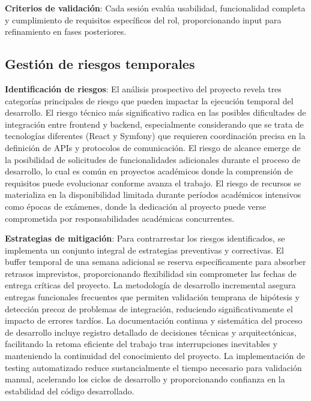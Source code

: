 \documentclass[12pt,a4paper,oneside]{report}
\begin{document}
\textbf{Criterios de validación}: Cada sesión evalúa usabilidad,
funcionalidad completa y cumplimiento de requisitos específicos del rol,
proporcionando input para refinamiento en fases posteriores.

\subsection{Gestión de riesgos
temporales}\label{gestiuxf3n-de-riesgos-temporales}

\textbf{Identificación de riesgos}: El análisis prospectivo del proyecto revela tres categorías principales de riesgo que pueden impactar la ejecución temporal del desarrollo. El riesgo técnico más significativo radica en las posibles dificultades de integración entre frontend y backend, especialmente considerando que se trata de tecnologías diferentes (React y Symfony) que requieren coordinación precisa en la definición de APIs y protocolos de comunicación. El riesgo de alcance emerge de la posibilidad de solicitudes de funcionalidades adicionales durante el proceso de desarrollo, lo cual es común en proyectos académicos donde la comprensión de requisitos puede evolucionar conforme avanza el trabajo. El riesgo de recursos se materializa en la disponibilidad limitada durante períodos académicos intensivos como épocas de exámenes, donde la dedicación al proyecto puede verse comprometida por responsabilidades académicas concurrentes.

\textbf{Estrategias de mitigación}: Para contrarrestar los riesgos identificados, se implementa un conjunto integral de estrategias preventivas y correctivas. El buffer temporal de una semana adicional se reserva específicamente para absorber retrasos imprevistos, proporcionando flexibilidad sin comprometer las fechas de entrega críticas del proyecto. La metodología de desarrollo incremental asegura entregas funcionales frecuentes que permiten validación temprana de hipótesis y detección precoz de problemas de integración, reduciendo significativamente el impacto de errores tardíos. La documentación continua y sistemática del proceso de desarrollo incluye registro detallado de decisiones técnicas y arquitectónicas, facilitando la retoma eficiente del trabajo tras interrupciones inevitables y manteniendo la continuidad del conocimiento del proyecto. La implementación de testing automatizado reduce sustancialmente el tiempo necesario para validación manual, acelerando los ciclos de desarrollo y proporcionando confianza en la estabilidad del código desarrollado.
\end{document}

